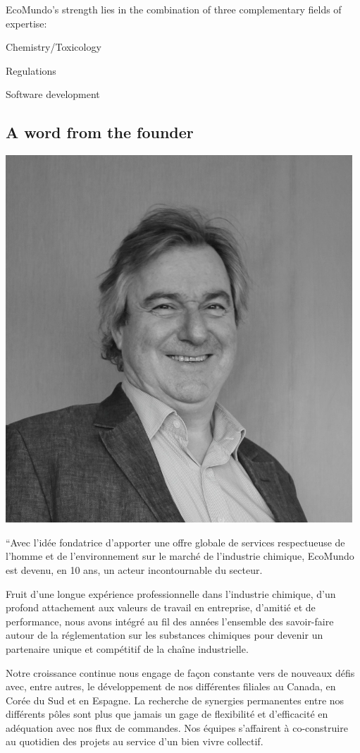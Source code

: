 \documentclass[a4paper,12pt,twoside]{report}
\begin{document}
EcoMundo's strength lies in the combination of three complementary fields of expertise:

\itemize[label=$\bullet$] 
\item Chemistry/Toxicology
\item Regulations
\item Software development
\subsection{A word from the founder}
\includegraphics[scale=0.5]{images/pierre}

“Avec l’idée fondatrice d’apporter une offre globale de services respectueuse de l’homme et de l’environnement sur le marché de l’industrie chimique, EcoMundo est devenu, en 10 ans, un acteur incontournable du secteur. 

Fruit d’une longue expérience professionnelle dans l’industrie chimique, d’un profond attachement aux valeurs de travail en entreprise, d’amitié et de performance, nous avons intégré au fil des années l’ensemble des savoir-faire autour de la réglementation sur les substances chimiques pour devenir un partenaire unique et compétitif de la chaîne industrielle.

Notre croissance continue nous engage de façon constante vers de nouveaux défis avec, entre autres, le développement de nos différentes filiales au Canada, en Corée du Sud et en Espagne. La recherche de synergies permanentes entre nos différents pôles sont plus que jamais un gage de flexibilité et d’efficacité en adéquation avec nos flux de commandes. Nos équipes s’affairent à co-construire au quotidien des projets au service d’un bien vivre collectif.
\end{document}
